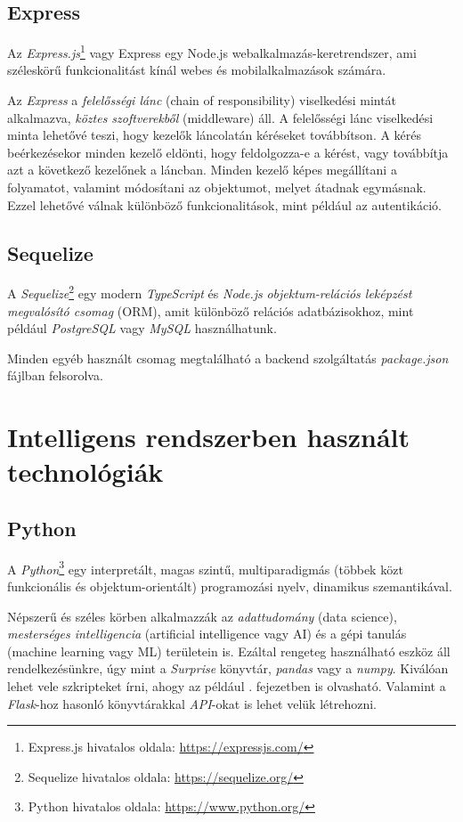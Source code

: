 \documentclass[
]{thesis-ekf}
\theoremstyle{definition}
\theoremstyle{remark}
\begin{document}
\subsection{Express}
Az \emph{Express.js}\footnote{Express.js hivatalos oldala: \url{https://expressjs.com/}} vagy Express egy Node.js webalkalmazás-keretrendszer, ami széleskörű funkcionalitást kínál webes és mobilalkalmazások számára.\cite{expressjs-homepage}


Az \emph{Express} a \emph{felelősségi lánc} (chain of responsibility) viselkedési mintát alkalmazva, \emph{köztes szoftverekből} (middleware) áll. A felelősségi lánc viselkedési minta lehetővé teszi, hogy kezelők láncolatán kéréseket továbbítson. A kérés beérkezésekor minden kezelő eldönti, hogy feldolgozza-e a kérést, vagy továbbítja azt a következő kezelőnek a láncban. Minden kezelő képes megállítani a folyamatot, valamint módosítani az objektumot, melyet átadnak egymásnak.\cite{chain-of-responsibility} Ezzel lehetővé válnak különböző funkcionalitások, mint például az autentikáció.

\subsection{Sequelize}
A \emph{Sequelize}\footnote{Sequelize hivatalos oldala: \url{https://sequelize.org/}} egy modern \emph{TypeScript} és \emph{Node.js} \emph{objektum-relációs leképzést megvalósító csomag} (ORM), amit különböző relációs adatbázisokhoz, mint például \emph{PostgreSQL} vagy \emph{MySQL} használhatunk.\cite{sequelize}

Minden egyéb használt csomag megtalálható a backend szolgáltatás \emph{package.json} fájlban felsorolva.

\section{Intelligens rendszerben használt technológiák}
\subsection{Python}
A \emph{Python}\footnote{Python hivatalos oldala: \url{https://www.python.org/}} egy interpretált, magas szintű, multiparadigmás (többek közt funkcionális és objektum-orientált) programozási nyelv, dinamikus szemantikával.

Népszerű és széles körben alkalmazzák az \emph{adattudomány} (data science), \emph{mesterséges intelligencia} (artificial intelligence vagy AI) és a gépi tanulás (machine learning vagy ML) területein is. Ezáltal rengeteg használható eszköz áll rendelkezésünkre, úgy mint a \emph{Surprise} könyvtár, \emph{pandas} vagy a \emph{numpy}. Kiválóan lehet vele szkripteket írni, ahogy az például . fejezetben is olvasható. Valamint a \emph{Flask}-hoz hasonló könyvtárakkal \emph{API}-okat is lehet velük létrehozni.
\end{document}
